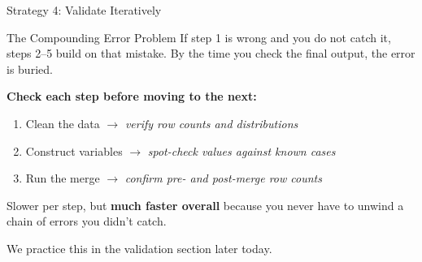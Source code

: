 \documentclass[aspectratio=169, 11pt]{beamer}
\begin{document}
\begin{frame}{Strategy 4: Validate Iteratively}
  \begin{alertblock}{The Compounding Error Problem}
    If step 1 is wrong and you do not catch it, steps 2--5 build on that mistake. By the time you check the final output, the error is buried.
  \end{alertblock}

  \vspace{0.5em}
  \textbf{Check each step before moving to the next:}
  \begin{enumerate}
    \item Clean the data $\rightarrow$ \textit{verify row counts and distributions}
    \item Construct variables $\rightarrow$ \textit{spot-check values against known cases}
    \item Run the merge $\rightarrow$ \textit{confirm pre- and post-merge row counts}
  \end{enumerate}

  \vspace{0.5em}
  Slower per step, but \textbf{much faster overall} because you never have to unwind a chain of errors you didn't catch.

  \vspace{0.5em}
  \alert{We practice this in the validation section later today.}
\end{frame}
\end{document}
